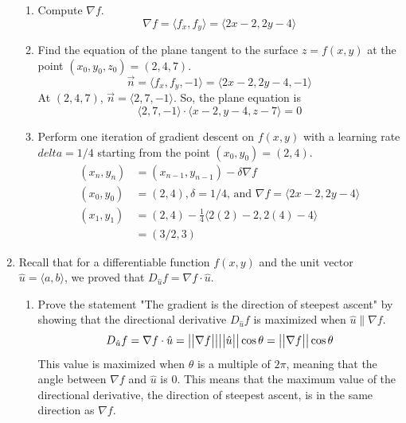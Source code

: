 \begin{enumerate}
\begin{enumerate}[label=\alph*.]
		\item Compute $\nabla f$.
		\begin{equation*}
			\nabla f = \langle f_x, f_y\rangle = \langle 2x-2, 2y-4 \rangle	
		\end{equation*}
		
		\item Find the equation of the plane tangent to the surface $z = f(x,y)$ at the point $(x_0, y_0, z_0) = (2,4,7)$.
		\begin{equation*}
			\vec{n} = \langle f_x, f_y, -1\rangle = \langle 2x-2, 2y-4, -1 \rangle	
		\end{equation*}
		At $(2,4,7)$, $\vec{n} = \langle 2, 7, -1 \rangle$. So, the plane equation is 
		\begin{equation*}
			\langle 2, 7, -1 \rangle \cdot \langle x-2, y-4, z-7 \rangle = 0	
		\end{equation*}
		
		\item Perform one iteration of gradient descent on $f(x,y)$ with a learning rate $delta = 1/4$ starting from the point $(x_0,y_0) = (2,4)$.\\
		\begin{align*}
			(x_n, y_n) &= (x_{n-1},y_{n-1}) - \delta\nabla f \\
			(x_0, y_0) &= (2,4), \delta = 1/4 \text{, and } \nabla f = \langle 	2x-2, 2y-4 \rangle \\
			(x_1, y_1) &= (2,4) - \frac{1}{4} \langle 2(2)-2, 2(4)-4 \rangle \\
			&= (3/2, 3)
		\end{align*}
	\end{enumerate}

	\item Recall that for a differentiable function $f(x,y)$ and the unit vector $\hat{u} = \langle a, b \rangle$, we proved that $D_{\hat{u}}f = \nabla f \cdot \hat{u}$.
	\begin{enumerate}[label=\alph*.]
		\item Prove the statement "The gradient is the direction of steepest ascent" by showing that the directional derivative $D_{\hat{u}}f$ is maximized when $\hat{u}\parallel\nabla f$.
		\begin{equation*}
			D_{\hat{u}}f = \nabla f \cdot \hat{u}=\big\lvert \big\lvert \nabla f \big\rvert \big\rvert\big\lvert \big\lvert \hat{u} \big\rvert \big\rvert\cos{\theta} = \big\lvert \big\lvert \nabla f \big\rvert \big\rvert\cos{\theta}	
		\end{equation*}
		This value is maximized when $\theta$ is a multiple of $2\pi$, meaning that the angle between $\nabla f$ and $\hat{u}$ is 0. This means that the maximum value of the directional derivative, the direction of steepest ascent, is in the same direction as $\nabla f$.\\
			

\end{enumerate}
\end{enumerate}
